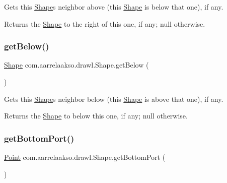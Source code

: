 Gets this \hyperlink{classcom_1_1aarrelaakso_1_1drawl_1_1_shape}{Shape}\textquotesingle{}s neighbor above (this \hyperlink{classcom_1_1aarrelaakso_1_1drawl_1_1_shape}{Shape} is below that one), if any. 

\begin{DoxyReturn}{Returns}
the \hyperlink{classcom_1_1aarrelaakso_1_1drawl_1_1_shape}{Shape} to the right of this one, if any; {\ttfamily null} otherwise. 
\end{DoxyReturn}
\mbox{\label{classcom_1_1aarrelaakso_1_1drawl_1_1_shape_a53de5ab609d879719cd3b372dfe8df58}} 
\subsubsection{\texorpdfstring{get\+Below()}{getBelow()}}
{\footnotesize\ttfamily \hyperlink{classcom_1_1aarrelaakso_1_1drawl_1_1_shape}{Shape} com.\+aarrelaakso.\+drawl.\+Shape.\+get\+Below (\begin{DoxyParamCaption}{ }\end{DoxyParamCaption})\hspace{0.3cm}{\ttfamily [inherited]}}



Gets this \hyperlink{classcom_1_1aarrelaakso_1_1drawl_1_1_shape}{Shape}\textquotesingle{}s neighbor below (this \hyperlink{classcom_1_1aarrelaakso_1_1drawl_1_1_shape}{Shape} is above that one), if any. 

\begin{DoxyReturn}{Returns}
the \hyperlink{classcom_1_1aarrelaakso_1_1drawl_1_1_shape}{Shape} to below this one, if any; {\ttfamily null} otherwise. 
\end{DoxyReturn}
\mbox{\label{classcom_1_1aarrelaakso_1_1drawl_1_1_shape_aba14efe9a16c0808580963c66b171082}} 
\subsubsection{\texorpdfstring{get\+Bottom\+Port()}{getBottomPort()}}
{\footnotesize\ttfamily \hyperlink{classcom_1_1aarrelaakso_1_1drawl_1_1_point}{Point} com.\+aarrelaakso.\+drawl.\+Shape.\+get\+Bottom\+Port (\begin{DoxyParamCaption}{ }\end{DoxyParamCaption})\hspace{0.3cm}{\ttfamily [inherited]}}



